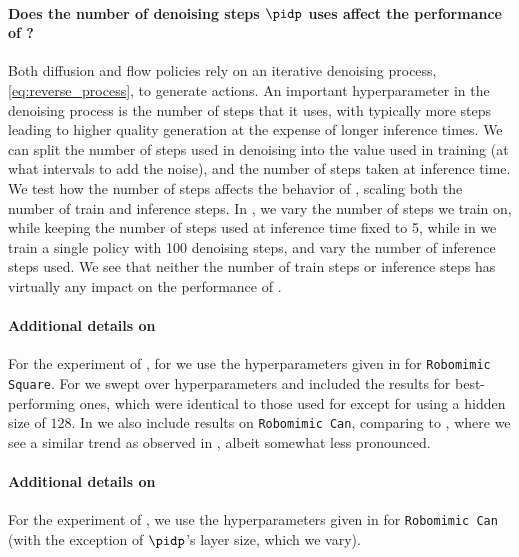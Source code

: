 \paragraph{Does the number of denoising steps $\pidp$ uses affect the performance of \algname?}
Both diffusion and flow policies rely on an iterative denoising process, \eqref{eq:reverse_process}, to generate actions. An important hyperparameter in the denoising process is the number of steps that it uses, with typically more steps leading to higher quality generation at the expense of longer inference times. We can split the number of steps used in denoising into the value used in training (at what intervals to add the noise), and the number of steps taken at inference time. We test how the number of steps affects the behavior of \algname, scaling both the number of train and inference steps. In , we vary the number of steps we train on, while keeping the number of steps used at inference time fixed to 5, while in  we train a single policy with 100 denoising steps, and vary the number of inference steps used. We see that neither the number of train steps or inference steps has virtually any impact on the performance of \algname.



\paragraph{Additional details on }
For the experiment of , for \algnamena we use the hyperparameters given in  for \texttt{Robomimic Square}. For \algnamesac we swept over hyperparameters and included the results for best-performing ones, which were identical to those used for \algnamena except for using a hidden size of $128$. 
In  we also include results on \texttt{Robomimic Can}, comparing \algnamena to \algnamesac, where we see a similar trend as observed in , albeit somewhat less pronounced.



\paragraph{Additional details on }
For the experiment of , we use the hyperparameters given in  for \texttt{Robomimic Can} (with the exception of $\pidp$'s layer size, which we vary). 



